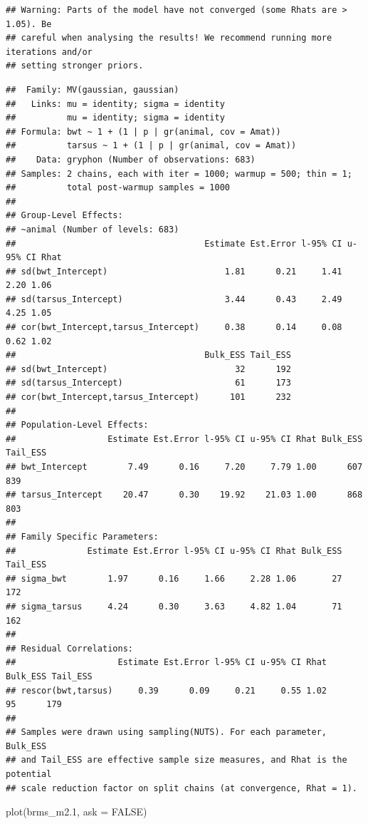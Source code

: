 \documentclass[
  12pt,
]{book}
\newenvironment{Shaded}{\begin{snugshade}}{\end{snugshade}}
\newcommand{\AttributeTok}[1]{\textcolor[rgb]{0.77,0.63,0.00}{#1}}
\newcommand{\ConstantTok}[1]{\textcolor[rgb]{0.00,0.00,0.00}{#1}}
\newcommand{\FloatTok}[1]{\textcolor[rgb]{0.00,0.00,0.81}{#1}}
\newcommand{\FunctionTok}[1]{\textcolor[rgb]{0.00,0.00,0.00}{#1}}
\newcommand{\NormalTok}[1]{#1}
\begin{document}
\begin{verbatim}
## Warning: Parts of the model have not converged (some Rhats are > 1.05). Be
## careful when analysing the results! We recommend running more iterations and/or
## setting stronger priors.
\end{verbatim}

\begin{verbatim}
##  Family: MV(gaussian, gaussian) 
##   Links: mu = identity; sigma = identity
##          mu = identity; sigma = identity 
## Formula: bwt ~ 1 + (1 | p | gr(animal, cov = Amat)) 
##          tarsus ~ 1 + (1 | p | gr(animal, cov = Amat)) 
##    Data: gryphon (Number of observations: 683) 
## Samples: 2 chains, each with iter = 1000; warmup = 500; thin = 1;
##          total post-warmup samples = 1000
## 
## Group-Level Effects: 
## ~animal (Number of levels: 683) 
##                                     Estimate Est.Error l-95% CI u-95% CI Rhat
## sd(bwt_Intercept)                       1.81      0.21     1.41     2.20 1.06
## sd(tarsus_Intercept)                    3.44      0.43     2.49     4.25 1.05
## cor(bwt_Intercept,tarsus_Intercept)     0.38      0.14     0.08     0.62 1.02
##                                     Bulk_ESS Tail_ESS
## sd(bwt_Intercept)                         32      192
## sd(tarsus_Intercept)                      61      173
## cor(bwt_Intercept,tarsus_Intercept)      101      232
## 
## Population-Level Effects: 
##                  Estimate Est.Error l-95% CI u-95% CI Rhat Bulk_ESS Tail_ESS
## bwt_Intercept        7.49      0.16     7.20     7.79 1.00      607      839
## tarsus_Intercept    20.47      0.30    19.92    21.03 1.00      868      803
## 
## Family Specific Parameters: 
##              Estimate Est.Error l-95% CI u-95% CI Rhat Bulk_ESS Tail_ESS
## sigma_bwt        1.97      0.16     1.66     2.28 1.06       27      172
## sigma_tarsus     4.24      0.30     3.63     4.82 1.04       71      162
## 
## Residual Correlations: 
##                    Estimate Est.Error l-95% CI u-95% CI Rhat Bulk_ESS Tail_ESS
## rescor(bwt,tarsus)     0.39      0.09     0.21     0.55 1.02       95      179
## 
## Samples were drawn using sampling(NUTS). For each parameter, Bulk_ESS
## and Tail_ESS are effective sample size measures, and Rhat is the potential
## scale reduction factor on split chains (at convergence, Rhat = 1).
\end{verbatim}

\begin{Shaded}
\begin{Highlighting}[]
\FunctionTok{plot}\NormalTok{(brms\_m2}\FloatTok{.1}\NormalTok{, }\AttributeTok{ask =} \ConstantTok{FALSE}\NormalTok{)}
\end{Highlighting}
\end{Shaded}
\end{document}
